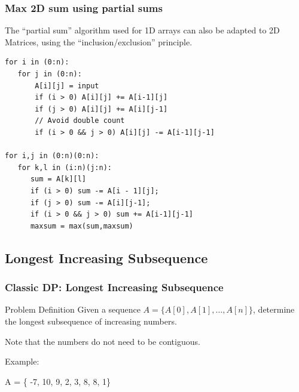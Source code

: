 \documentclass{beamer}
\begin{document}
\begin{frame}[fragile]
  \frametitle{Max 2D sum using partial sums}
  \begin{block}{}
    The ``partial sum'' algorithm used for 1D arrays can also be
    adapted to 2D Matrices, using the ``inclusion/exclusion''
    principle.
  \end{block}

\begin{block}{}
{\smaller
\begin{verbatim}
for i in (0:n):
   for j in (0:n):
       A[i][j] = input
       if (i > 0) A[i][j] += A[i-1][j]
       if (j > 0) A[i][j] += A[i][j-1]
       // Avoid double count
       if (i > 0 && j > 0) A[i][j] -= A[i-1][j-1]

for i,j in (0:n)(0:n):
   for k,l in (i:n)(j:n):
      sum = A[k][l]
      if (i > 0) sum -= A[i - 1][j];
      if (j > 0) sum -= A[i][j-1];
      if (i > 0 && j > 0) sum += A[i-1][j-1]
      maxsum = max(sum,maxsum)
\end{verbatim}
}
\end{block}

\end{frame}

\subsection{Longest Increasing Subsequence}

\begin{frame}
  \frametitle{Classic DP: Longest Increasing Subsequence}
  \begin{block}{Problem Definition}
    Given a sequence $A = \{A[0],A[1],\ldots,A[n]\}$, determine the
    longest subsequence of increasing numbers.

    \smallskip

    Note that the numbers do not need to be contiguous.
  \end{block}

  Example:

  \bigskip

  A = \{ \alert{-7}, 10, 9, \alert{2}, \alert{3}, \alert{8}, 8, 1\}
\end{frame}
\end{document}
